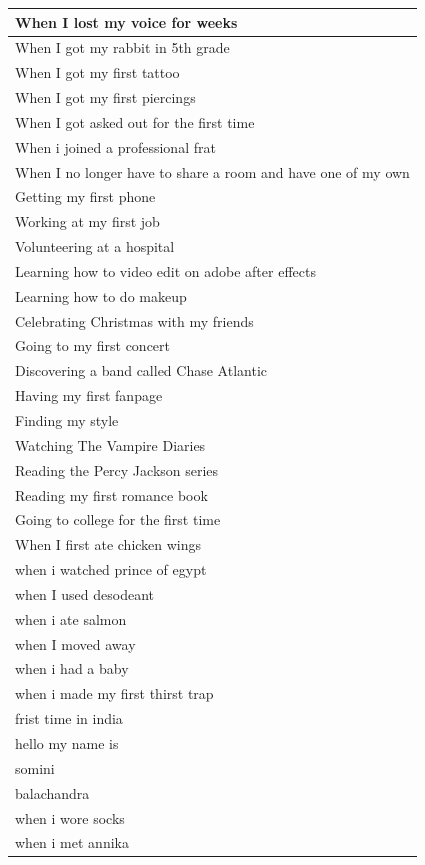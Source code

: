 \documentclass[
  .7em,
  letterpaper,
  DIV=11,
  numbers=noendperiod]{scrartcl}
\begin{document}
\begin{table}
\begin{tabular}{l}
\hline
When I lost my voice for weeks\\
\hline
When I got my rabbit in 5th grade\\
\hline
When I got my first tattoo\\
\hline
When I got my first piercings\\
\hline
When I got asked out for the first time\\
\hline
When i joined a professional frat\\
\hline
When I no longer have to share a room and have one of my own\\
\hline
Getting my first phone\\
\hline
Working at my first job\\
\hline
Volunteering at a hospital\\
\hline
Learning how to video edit on adobe after effects\\
\hline
Learning how to do makeup\\
\hline
Celebrating Christmas with my friends\\
\hline
Going to my first concert\\
\hline
Discovering a band called Chase Atlantic\\
\hline
Having my first fanpage\\
\hline
Finding my style\\
\hline
Watching The Vampire Diaries\\
\hline
Reading the Percy Jackson series\\
\hline
Reading my first romance book\\
\hline
Going to college for the first time\\
\hline
When I first ate chicken wings\\
\hline
when i watched prince of egypt\\
\hline
when I used desodeant\\
\hline
when i ate salmon\\
\hline
when I moved away\\
\hline
when i had a baby\\
\hline
when i made my first thirst trap\\
\hline
frist time in india\\
\hline
hello my name is\\
\hline
somini\\
\hline
balachandra\\
\hline
when i wore socks\\
\hline
when i met annika\\

\end{tabular}
\end{table}
\end{document}

